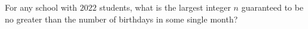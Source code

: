 For any school with $2022$ students, what is the largest integer $n$ guaranteed to be no greater than the number of birthdays in some single month?
